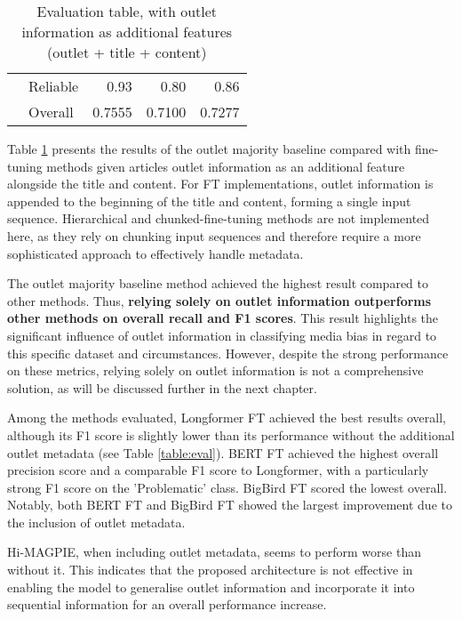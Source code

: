 \begin{table}[htbp]
\begin{tabular}{| c | l | r | r | r |}
                                                          & Reliable           & 0.93               & 0.80            & 0.86            \\\cline{2-5}
                                                          & Overall            & 0.7555             & 0.7100          & 0.7277          \\
        \hline
    \end{tabular}
    \caption{Evaluation table, with outlet information as additional features (outlet + title + content)}
    \label{table:eval-outlet}
\end{table}

Table \ref{table:eval-outlet} presents the results of the outlet majority baseline compared with fine-tuning methods given articles outlet information as an additional feature alongside the title and content. For FT implementations, outlet information is appended to the beginning of the title and content, forming a single input sequence. Hierarchical and chunked-fine-tuning methods are not implemented here, as they rely on chunking input sequences and therefore require a more sophisticated approach to effectively handle metadata.

The outlet majority baseline method achieved the highest result compared to other methods. Thus, \textbf{relying solely on outlet information outperforms other methods on overall recall and F1 scores}. This result highlights the significant influence of outlet information in classifying media bias in regard to this specific dataset and circumstances. However, despite the strong performance on these metrics, relying solely on outlet information is not a comprehensive solution, as will be discussed further in the next chapter.

Among the methods evaluated, Longformer FT achieved the best results overall, although its F1 score is slightly lower than its performance without the additional outlet metadata (see Table \ref{table:eval}). BERT FT achieved the highest overall precision score and a comparable F1 score to Longformer, with a particularly strong F1 score on the 'Problematic' class. BigBird FT scored the lowest overall. Notably, both BERT FT and BigBird FT showed the largest improvement due to the inclusion of outlet metadata.

Hi-MAGPIE, when including outlet metadata, seems to perform worse than without it. This indicates that the proposed architecture is not effective in enabling the model to generalise outlet information and incorporate it into sequential information for an overall performance increase.

